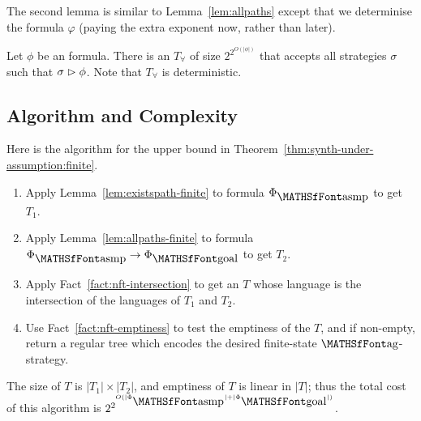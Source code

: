 %             

The second lemma is similar to Lemma~\ref{lem:allpaths} except that we determinise the formula $\varphi$ (paying the extra exponent now, rather than later).
\begin{lemma} \label{lem:allpaths-finite}
Let $\phi$ be an \LTLf formula. There is an \DFT $T_\forall$ of size $2^{2^{O(|\phi|)}}$ that accepts all strategies $\sigma$ such that 
$\sigma \vartriangleright \phi$. Note that $T_\forall$ is deterministic.
\end{lemma}

\subsection{Algorithm and Complexity} \label{sec:alg:finite}

Here is the algorithm for the upper bound in Theorem~\ref{thm:synth-under-assumption:finite}.

\begin{enumerate}
\item Apply Lemma~\ref{lem:existspath-finite} to formula $\formula{\asmp}$ to get \NFT $T_1$.
\item Apply Lemma~\ref{lem:allpaths-finite} to formula $\formula{\asmp} \limp \formula{\goal}$ to get \DFT $T_2$.
\item Apply Fact~\ref{fact:nft-intersection} to get an \NFT $T$ whose language is the intersection of the languages of $T_1$ and $T_2$.
\item Use Fact~\ref{fact:nft-emptiness} to test the emptiness of the \NFT $T$, and if non-empty, return a regular tree which encodes the desired finite-state ${\ag}$-strategy.
\end{enumerate}


The size of $T$ is $|T_1| \times |T_2|$, and emptiness of $T$ is linear in $|T|$; thus the total cost of this algorithm is 
$2^{2^{O(|\formula{\asmp}| + |\formula{\goal}|)}}$.








